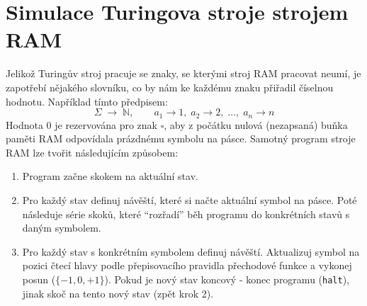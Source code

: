 \section{Simulace Turingova stroje strojem RAM}
\label{sec:simulationTheory}
Jelikož Turingův stroj pracuje se znaky, se kterými stroj RAM pracovat neumí, je zapotřebí nějakého slovníku, 
co by nám ke každému znaku přiřadil číselnou hodnotu. Například tímto předpisem:
\[
  \Sigma \;\longrightarrow\; \mathbb{N},\qquad 
  a_1 \rightarrow 1,\; a_2 \rightarrow 2,\;\dots,\; a_n \rightarrow n
\]
Hodnota 0 je rezervována pro znak $\square$, aby z počátku nulová (nezapsaná) buňka paměti RAM odpovídala prázdnému symbolu na pásce.
Samotný program stroje RAM lze tvořit následujícím způsobem:
\begin{enumerate}
	\item Program začne skokem na aktuální stav.
	\item Pro každý stav definuj návěští, které si načte aktuální symbol na pásce. 
		Poté následuje série skoků, které \enquote{rozřadí} běh programu do konkrétních stavů s daným symbolem.
	\item Pro každý stav s konkrétním symbolem definuj návěští. Aktualizuj symbol na pozici čtecí hlavy podle přepisovacího pravidla přechodové funkce a vykonej posun ($\{-1, 0, +1\}$). 
		Pokud je nový stav koncový - konec programu (\texttt{halt}), jinak skoč na tento nový stav (zpět krok 2).
\end{enumerate}
